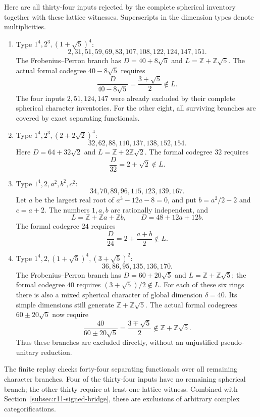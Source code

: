 \documentclass[11pt,a4paper]{article}
\begin{document}
Here are all thirty-four inputs rejected by the complete spherical
inventory together with these lattice witnesses. Superscripts in the
dimension types denote multiplicities.
\begin{enumerate}
\item Type $1^4,2^3,(1+\sqrt5)^4$:
\[
 2,31,51,59,69,83,107,108,122,124,147,151.
\]
The Frobenius--Perron branch has
$D=40+8\sqrt5$ and $L=\mathbb Z+\mathbb Z\sqrt5$.
The actual formal codegree $40-8\sqrt5$ requires
\[
 \frac{D}{40-8\sqrt5}=\frac{3+\sqrt5}{2}\notin L.
\]
The four inputs $2,51,124,147$ were already excluded by their complete
spherical character inventories. For the other eight, all surviving
branches are covered by exact separating functionals.

\item Type $1^4,2^3,(2+2\sqrt2)^4$:
\[
 32,62,88,110,137,138,152,154.
\]
Here $D=64+32\sqrt2$ and $L=\mathbb Z+2\mathbb Z\sqrt2$.
The formal codegree $32$ requires
\[
 \frac{D}{32}=2+\sqrt2\notin L.
\]

\item Type $1^4,2,a^2,b^2,c^2$:
\[
 34,70,89,96,115,123,139,167.
\]
Let $a$ be the largest real root of $a^3-12a-8=0$, and put
$b=a^2/2-2$ and $c=a+2$.
The numbers $1,a,b$ are rationally independent, and
\[
 L=\mathbb Z+\mathbb Za+\mathbb Zb,
 \qquad D=48+12a+12b.
\]
The formal codegree $24$ requires
\[
 \frac{D}{24}=2+\frac{a+b}{2}\notin L.
\]

\item Type $1^4,2,(1+\sqrt5)^4,(3+\sqrt5)^2$:
\[
 36,86,95,135,136,170.
\]
The Frobenius--Perron branch has $D=60+20\sqrt5$ and
$L=\mathbb Z+\mathbb Z\sqrt5$; the formal codegree $40$ requires
$(3+\sqrt5)/2\notin L$.
For each of these six rings there is also a mixed spherical character
of global dimension $\delta=40$. Its simple dimensions still generate
$\mathbb Z+\mathbb Z\sqrt5$. The actual formal codegrees
$60\pm20\sqrt5$ now require
\[
 \frac{40}{60\pm20\sqrt5}=\frac{3\mp\sqrt5}{2}
 \notin\mathbb Z+\mathbb Z\sqrt5.
\]
Thus these branches are excluded directly, without an unjustified
pseudo-unitary reduction.
\end{enumerate}

The finite replay checks forty-four separating functionals over all
remaining character branches. Four of the thirty-four inputs have no
remaining spherical branch; the other thirty require at least one lattice
witness. Combined with Section~\ref{subsec:r11-signed-bridge}, these are
exclusions of arbitrary complex categorifications.
\end{document}
